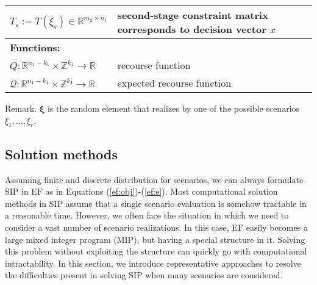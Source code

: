 \begin{table}[]
{\begin{threeparttable}
\begin{tabular}{ll}
				$T_s:= T(\xi_s)\in\mathbb{R}^{m_2\times n_1}$	& second-stage constraint matrix corresponds to decision vector $x$\\ \midrule
				\multicolumn{2}{l}{\textbf{Functions:}} \\
				$Q:\mathbb{R}^{n_1-k_1}\times\mathbb{Z}^{k_1}\to\mathbb{R}$	& recourse function \\
				$\mathcal{Q}:\mathbb{R}^{n_1-k_1}\times\mathbb{Z}^{k_1}\to\mathbb{R}$	& expected recourse function\\
				\bottomrule
			\end{tabular}
			\begin{tablenotes}
			\small
			\item Remark. $\pmb{\xi}$ is the random element that realizes by one of the possible scenarios $\xi_1,\ldots,\xi_r$.		
			\end{tablenotes}
		\end{threeparttable}
	}
\end{table} 


\subsection{Solution methods}
Assuming finite and discrete distribution for scenarios, we can always formulate SIP in EF as in Equations (\ref{ef:obj})-(\ref{ef:e}).  %
Most computational solution methods in SIP assume that a single scenario evaluation is somehow tractable in a reasonable time. However, we often face the situation in which we need to consider a vast number of scenario realizations. In this case, EF easily becomes a large mixed integer program (MIP), but having a special structure in it. Solving this problem without exploiting the structure can quickly go with computational intractability. In this section, we introduce representative approaches to resolve the difficulties present in solving SIP when many scenarios are considered.

